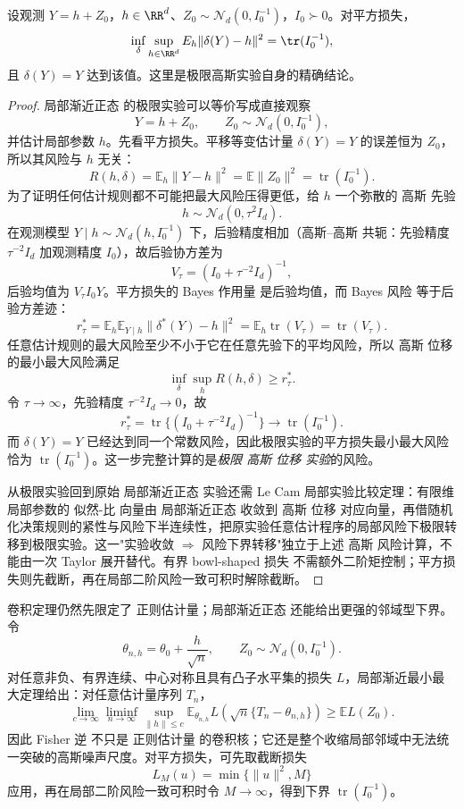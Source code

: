 \begin{theorem}[高斯位移实验的平方损失极小极大风险]
设观测 $Y=h+Z_0$，$h\in\RR^d$、$Z_0\sim\mathcal N_d(0,I_0^{-1})$，$I_0\succ0$。对平方损失，
\[
\inf_\delta\sup_{h\in\RR^d}E_h\|\delta(Y)-h\|^2=\tr(I_0^{-1}),
\]
且 $\delta(Y)=Y$ 达到该值。这里是极限高斯实验自身的精确结论。
\end{theorem}
\begin{proof}
局部渐近正态 的极限实验可以等价写成直接观察
\[
 Y=h+Z_0,
 \qquad
 Z_0\sim\mathcal N_d(0,I_0^{-1}),
\]
并估计局部参数 $h$。先看平方损失。平移等变估计量 $\delta(Y)=Y$ 的误差恒为 $Z_0$，所以其风险与 $h$ 无关：
\[
 R(h,\delta)
 =\mathbb E_h\|Y-h\|^2
 =\mathbb E\|Z_0\|^2
 =\operatorname{tr}(I_0^{-1}).
\]
为了证明任何估计规则都不可能把最大风险压得更低，给 $h$ 一个弥散的 高斯 先验
\[
 h\sim\mathcal N_d(0,\tau^2I_d).
\]
在观测模型 $Y\mid h\sim\mathcal N_d(h,I_0^{-1})$ 下，后验精度相加（高斯--高斯 共轭：先验精度 $\tau^{-2}I_d$ 加观测精度 $I_0$），故后验协方差为
\[
 V_\tau
 =(I_0+\tau^{-2}I_d)^{-1},
\]
后验均值为 $V_\tau I_0 Y$。平方损失的 Bayes 作用量 是后验均值，而 Bayes 风险 等于后验方差迹：
\[
 r_\tau^*
 =\mathbb E_h\mathbb E_{Y\mid h}\|\delta^*(Y)-h\|^2
 =\mathbb E_h\operatorname{tr}(V_\tau)
 =\operatorname{tr}(V_\tau).
\]
任意估计规则的最大风险至少不小于它在任意先验下的平均风险，所以 高斯 位移 的最小最大风险满足
\[
 \inf_\delta\sup_hR(h,\delta)
 \ge r_\tau^*.
\]
令 $\tau\to\infty$，先验精度 $\tau^{-2}I_d\to0$，故
\[
 r_\tau^*=\operatorname{tr}\{(I_0+\tau^{-2}I_d)^{-1}\}\to\operatorname{tr}(I_0^{-1}).
\]
而 $\delta(Y)=Y$ 已经达到同一个常数风险，因此极限实验的平方损失最小最大风险恰为 $\operatorname{tr}(I_0^{-1})$。这一步完整计算的是\emph{极限 高斯 位移 实验}的风险。

从极限实验回到原始 局部渐近正态 实验还需 Le Cam 局部实验比较定理：有限维局部参数的 似然-比 向量由 局部渐近正态 收敛到 高斯 位移 对应向量，再借随机化决策规则的紧性与风险下半连续性，把原实验任意估计程序的局部风险下极限转移到极限实验。这一"实验收敛 $\Rightarrow$ 风险下界转移"独立于上述 高斯 风险计算，不能由一次 Taylor 展开替代。有界 bowl-shaped 损失 不需额外二阶矩控制；平方损失则先截断，再在局部二阶风险一致可积时解除截断。
\end{proof}


\begin{theorem}[局部渐近极小极大界]
卷积定理仍然先限定了 正则估计量；局部渐近正态 还能给出更强的邻域型下界。令
\[
 \theta_{n,h}=\theta_0+\frac{h}{\sqrt n},
 \qquad
 Z_0\sim\mathcal N_d(0,I_0^{-1}).
\]
对任意非负、有界连续、中心对称且具有凸子水平集的损失 $L$，局部渐近最小最大定理给出：对任意估计量序列 $T_n$，
\begin{equation}\label{eq:math-stat-local-asymptotic-minimax}
 \lim_{c\to\infty}\liminf_{n\to\infty}
 \sup_{\|h\|\le c}
 \mathbb E_{\theta_{n,h}}
 L\!\left(\sqrt n\{T_n-\theta_{n,h}\}\right)
 \ge \mathbb E L(Z_0).
\end{equation}
因此 Fisher 逆 不只是 正则估计量 的卷积核；它还是整个收缩局部邻域中无法统一突破的高斯噪声尺度。对平方损失，可先取截断损失
\[
 L_M(u)=\min\{\|u\|^2,M\}
\]
应用，再在局部二阶风险一致可积时令 $M\to\infty$，得到下界 $\operatorname{tr}(I_0^{-1})$。
\end{theorem}

